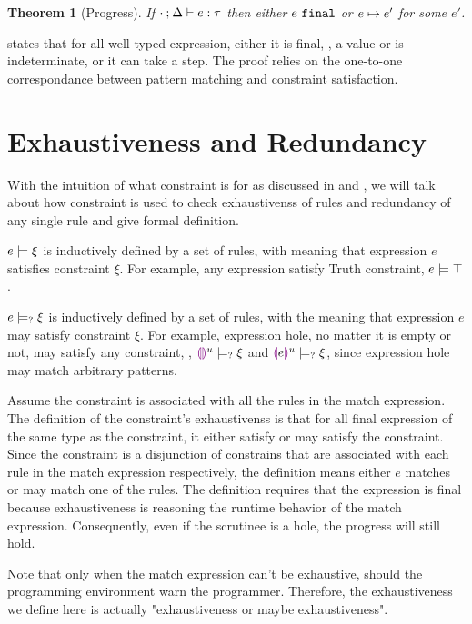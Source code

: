 \documentclass[acmsmall,screen,review,nonacm]{acmart}
\theoremstyle{slplain}
\newtheorem{thm}{Theorem}  %
\numberwithin{thm}{section}
\begin{document}
\begin{thm}[Progress]
 \label{thm:progress}
 If $\cdot \mathbin{;} \Delta \vdash e : \tau$ then either $e ~\mathtt{final}$ or $e \mapsto e'$ for some $e'$.
\end{thm}

 states that for all well-typed expression, either it is final, \ie, a value or is indeterminate, or it can take a step. The proof relies on the one-to-one correspondance between pattern matching and constraint satisfaction.

\section{Exhaustiveness and Redundancy}
\label{sec:exhaustivens-redundancy}

With the intuition of what constraint is for as discussed in  and , we will talk about how constraint is used to check exhaustivenss of rules and redundancy of any single rule and give formal definition.

$e \models \xi$ is inductively defined by a set of rules, with meaning that expression $e$ satisfies constraint $\xi$. For example, any expression satisfy Truth constraint, $e \models \top$.

$e \models_{?} \xi$ is inductively defined by a set of rules, with the meaning that expression $e$ may satisfy constraint $\xi$. For example, expression hole, no matter it is empty or not, may satisfy any constraint, \ie, $\textcolor{violet}{\llparenthesis}\textcolor{violet}{\rrparenthesis}^{u} \models_{?} \xi$ and $\textcolor{violet}{\llparenthesis} e\textcolor{violet}{\rrparenthesis}^{u} \models_{?} \xi$, since expression hole may match arbitrary patterns.

Assume the constraint is associated with all the rules in the match expression. The definition of the constraint's exhaustivenss is that for all final expression of the same type as the constraint, it either satisfy or may satisfy the constraint. Since the constraint is a disjunction of constrains that are associated with each rule in the match expression respectively, the definition means either $e$ matches or may match one of the rules.
The definition requires that the expression is final because exhaustiveness is reasoning the runtime behavior of the match expression. Consequently, even if the scrutinee is a hole, the progress will still hold.

Note that only when the match expression can't be exhaustive, should the programming environment warn the programmer. Therefore, the exhaustiveness we define here is actually "exhaustiveness or maybe exhaustiveness".
\end{document}
